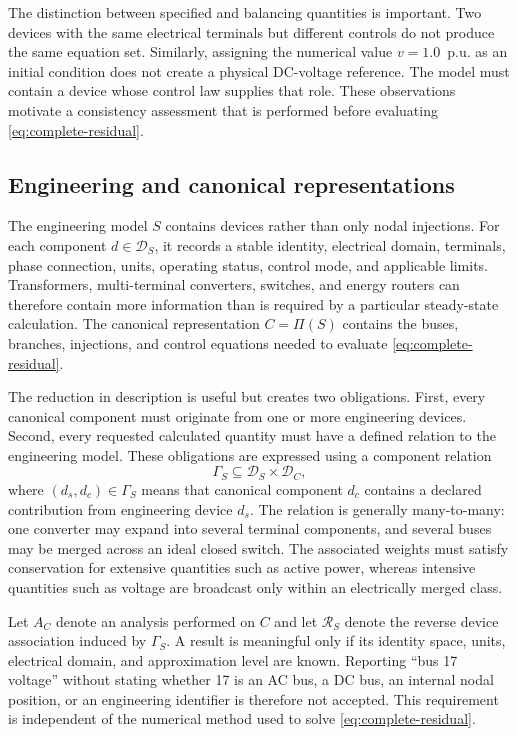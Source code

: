 \documentclass[final,5p,times,twocolumn]{elsarticle}
\newcommand{\Rmap}{\mathcal R}
\newcommand{\Proj}{\Pi}
\begin{document}
The distinction between specified and balancing quantities is important. Two
devices with the same electrical terminals but different controls do not
produce the same equation set. Similarly, assigning the numerical value
$v=1.0$~p.u. as an initial condition does not create a physical DC-voltage
reference. The model must contain a device whose control law supplies that
role. These observations motivate a consistency assessment that is performed
before evaluating \eqref{eq:complete-residual}.

\subsection{Engineering and canonical representations}

The engineering model $S$ contains devices rather than only nodal injections.
For each component $d\in\mathcal D_S$, it records a stable identity, electrical
domain, terminals, phase connection, units, operating status, control mode, and
applicable limits. Transformers, multi-terminal converters, switches, and
energy routers can therefore contain more information than is required by a
particular steady-state calculation. The canonical representation
$C=\Proj(S)$ contains the buses, branches, injections, and control equations
needed to evaluate \eqref{eq:complete-residual}.

The reduction in description is useful but creates two obligations. First,
every canonical component must originate from one or more engineering devices.
Second, every requested calculated quantity must have a defined relation to the
engineering model. These obligations are expressed using a component relation
\begin{equation}
 \Gamma_S\subseteq \mathcal D_S\times\mathcal D_C,
 \label{eq:component-relation}
\end{equation}
where $(d_s,d_c)\in\Gamma_S$ means that canonical component $d_c$ contains a
declared contribution from engineering device $d_s$. The relation is generally
many-to-many: one converter may expand into several terminal components, and
several buses may be merged across an ideal closed switch. The associated
weights must satisfy conservation for extensive quantities such as active
power, whereas intensive quantities such as voltage are broadcast only within
an electrically merged class.

Let $A_C$ denote an analysis performed on $C$ and let $\Rmap_S$ denote the
reverse device association induced by $\Gamma_S$. A result is meaningful only
if its identity space, units, electrical domain, and approximation level are
known. Reporting ``bus 17 voltage'' without stating whether 17 is an AC bus, a
DC bus, an internal nodal position, or an engineering identifier is therefore
not accepted. This requirement is independent of the numerical method used to
solve \eqref{eq:complete-residual}.
\end{document}
